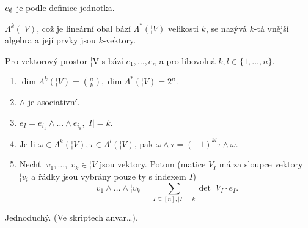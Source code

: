 \documentclass[12pt]{article}                   %
\begin{document}
    \begin{poznamka}
        $e_\emptyset$ je podle definice jednotka.

        $\Lambda^k(¦V)$, což je lineární obal bází $\Lambda^*(¦V)$ velikosti $k$, se nazývá $k$-tá vnější algebra a její prvky jsou $k$-vektory.
    \end{poznamka}

    \begin{veta}
        Pro vektorový prostor ¦V s bází $e_1, …, e_n$ a pro libovolná $k, l \in \{1, …, n\}$.
        \begin{enumerate}
            \item $\dim \Lambda^k(¦V) = \binom{n}{k}, \dim \Lambda^*(¦V) = 2^n.$
            \item $\wedge$ je asociativní.
            \item $e_I = e_{i_1} \wedge … \wedge e_{i_k}, |I|=k$.
            \item Je-li $\omega \in \Lambda^k(¦V), \tau \in \Lambda^l(¦V)$, pak $\omega \wedge \tau = (-1)^{kl}\tau \wedge \omega$.
            \item Nechť $¦v_1, …, ¦v_k \in ¦V$ jsou vektory. Potom (matice $V_I$ má za sloupce vektory $¦v_i$ a řádky jsou vybrány pouze ty s indexem $I$)
                $$¦v_1 \wedge … \wedge ¦v_k = \sum_{I \subseteq [n], |I|=k} \det ¦V_I·e_I.$$
        \end{enumerate}

        \begin{dukazin}
            Jednoduchý. (Ve skriptech anvar…).
        \end{dukazin}
    \end{veta}
\end{document}

